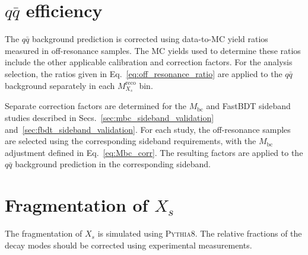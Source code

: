 \section{$q\bar{q}$ efficiency}
\label{sec:qq_eff_corr}
The $q\bar{q}$ background prediction is corrected using data-to-MC yield ratios measured in off-resonance samples.
The MC yields used to determine these ratios include the other applicable calibration and correction factors.
For the analysis selection, the ratios given in Eq.~\ref{eq:off_resonance_ratio} are applied to the $q\bar{q}$ background separately in each $M_{X_{s}}^{\textrm{reco}}$ bin.

Separate correction factors are determined for the $M_{\textrm{bc}}$ and FastBDT sideband studies described in Secs.~\ref{sec:mbc_sideband_validation} and~\ref{sec:fbdt_sideband_validation}.
For each study, the off-resonance samples are selected using the corresponding sideband requirements, with the $M_{\textrm{bc}}$ adjustment defined in Eq.~\ref{eq:Mbc_corr}.
The resulting factors are applied to the $q\bar{q}$ background prediction in the corresponding sideband.

\section{Fragmentation of $X_{s}$}
\label{sec:frag_corr}
The fragmentation of $X_{s}$ is simulated using \textsc{Pythia8}.
The relative fractions of the decay modes should be corrected using experimental measurements.

